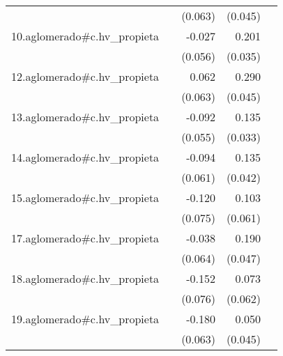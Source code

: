 {\begin{longtable}{l*{4}{D{.}{.}{-1}}}
            &                     &     (0.063)         &     (0.045)         &                     \\
\addlinespace
10.aglomerado#c.hv\_propieta&                     &      -0.027         &       0.201\sym{***}&                     \\
            &                     &     (0.056)         &     (0.035)         &                     \\
\addlinespace
12.aglomerado#c.hv\_propieta&                     &       0.062         &       0.290\sym{***}&                     \\
            &                     &     (0.063)         &     (0.045)         &                     \\
\addlinespace
13.aglomerado#c.hv\_propieta&                     &      -0.092         &       0.135\sym{***}&                     \\
            &                     &     (0.055)         &     (0.033)         &                     \\
\addlinespace
14.aglomerado#c.hv\_propieta&                     &      -0.094         &       0.135\sym{**} &                     \\
            &                     &     (0.061)         &     (0.042)         &                     \\
\addlinespace
15.aglomerado#c.hv\_propieta&                     &      -0.120         &       0.103         &                     \\
            &                     &     (0.075)         &     (0.061)         &                     \\
\addlinespace
17.aglomerado#c.hv\_propieta&                     &      -0.038         &       0.190\sym{***}&                     \\
            &                     &     (0.064)         &     (0.047)         &                     \\
\addlinespace
18.aglomerado#c.hv\_propieta&                     &      -0.152\sym{*}  &       0.073         &                     \\
            &                     &     (0.076)         &     (0.062)         &                     \\
\addlinespace
19.aglomerado#c.hv\_propieta&                     &      -0.180\sym{**} &       0.050         &                     \\
            &                     &     (0.063)         &     (0.045)         &                     \\

\end{longtable}}
